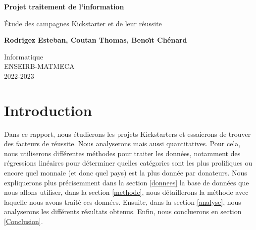 \documentclass{article}
\begin{document}
\begin{titlepage}
    \begin{center}
        \vspace*{6cm}
 
        \textbf{\huge{Projet traitement de l'information}}
 
        \vspace{0.5cm}
        \large{\'Etude des campagnes Kickstarter et de leur r\'eussite}
             
        \vspace{1.5cm}
 
        \textbf{Rodrigez Esteban, Coutan Thomas, Beno\^\i t Ch\'enard}
 
        \vfill
        Informatique\\
        ENSEIRB-MATMECA\\
        2022-2023 
    \end{center}
 \end{titlepage}

\renewcommand\contentsname{Table des mati\`eres}
\tableofcontents
\newpage

\section{Introduction}

\tabto{1cm} Dans ce rapport, nous étudierons les projets Kickstarters et essaierons de trouver des facteurs de réussite. Nous analyserons mais aussi quantitatives.
Pour cela, nous utiliserons différentes méthodes pour traiter les données, notamment des régressions linéaires pour déterminer quelles catégories sont les plus prolifiques ou encore quel monnaie (et donc quel pays) est la plus donnée par donateurs.
\tabto{1cm} Nous expliquerons plus précisemment dans la section \ref{donnees} la base de données que nous allons utiliser, dans la section \ref{methode}, nous détaillerons la méthode avec laquelle nous avons traité ces données.
Ensuite, dans la section \ref{analyse}, nous analyserons les différents résultats obtenus. Enfin, nous concluerons en section \ref{Conclusion}. 
\\ 
\\
\end{document}
